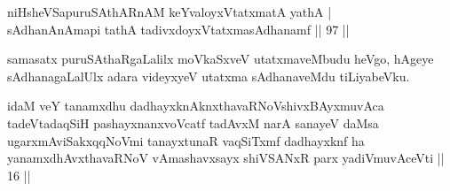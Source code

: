 \begin{shl}
niHsheVSapuruSAthARnAM keYvaloyxVtatxmatA yathA |\\
sAdhanAnAmapi tathA tadivxdoyxVtatxmasAdhanamf \hfill || 97 ||
\end{shl}

\begin{artha}
samasatx puruSAthaRgaLalilx moVkaSxveV utatxmaveMbudu heVgo, hAgeye sAdhanagaLalUlx adara videyxyeV utatxma sAdhanaveMdu tiLiyabeVku.
\end{artha}

\newpage


\begin{kandikeshl}
idaM veY tanamxdhu dadhayxknAknxthavaRNoV\s shivxBAyxmuvAca tadeVtadaqSiH pashayxnanxvoVcatf tadAvxM narA sanayeV daMsa ugarxmAviSakxqqNoVmi tanayxtunaR vaqSiTxmf dadhayxknf ha yanamxdhAvxthavaRNoV vAmashavxsayx shiVSANxR parx yadiVmuvAceVti || 16 ||
\end{kandikeshl}


